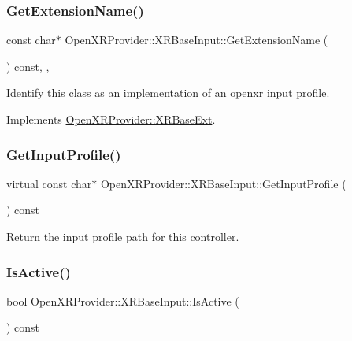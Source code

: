 \subsubsection{\texorpdfstring{GetExtensionName()}{GetExtensionName()}}
{\footnotesize\ttfamily const char$\ast$ Open\+X\+R\+Provider\+::\+X\+R\+Base\+Input\+::\+Get\+Extension\+Name (\begin{DoxyParamCaption}{ }\end{DoxyParamCaption}) const\hspace{0.3cm}{\ttfamily [inline]}, {\ttfamily [override]}, {\ttfamily [virtual]}}



Identify this class as an implementation of an openxr input profile. 



Implements \mbox{\hyperlink{class_open_x_r_provider_1_1_x_r_base_ext_af23385b0dc226b0c4533a796ddc37352}{Open\+X\+R\+Provider\+::\+X\+R\+Base\+Ext}}.

\mbox{\label{class_open_x_r_provider_1_1_x_r_base_input_ad12f6bf197b668bce45a6993de4728b5}} 
\subsubsection{\texorpdfstring{GetInputProfile()}{GetInputProfile()}}
{\footnotesize\ttfamily virtual const char$\ast$ Open\+X\+R\+Provider\+::\+X\+R\+Base\+Input\+::\+Get\+Input\+Profile (\begin{DoxyParamCaption}{ }\end{DoxyParamCaption}) const\hspace{0.3cm}{\ttfamily [pure virtual]}}



Return the input profile path for this controller. 

\mbox{\label{class_open_x_r_provider_1_1_x_r_base_input_a1b727a927d0d5a32628e6b8749fa24d5}} 
\subsubsection{\texorpdfstring{IsActive()}{IsActive()}\hspace{0.1cm}{\footnotesize\ttfamily [1/2]}}
{\footnotesize\ttfamily bool Open\+X\+R\+Provider\+::\+X\+R\+Base\+Input\+::\+Is\+Active (\begin{DoxyParamCaption}{ }\end{DoxyParamCaption}) const\hspace{0.3cm}{\ttfamily [inline]}}



